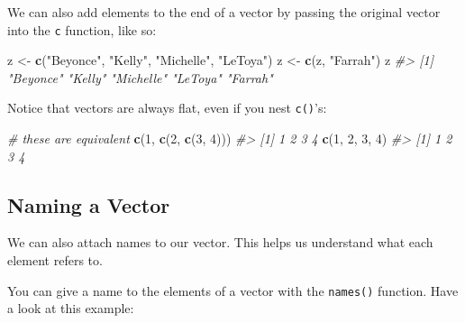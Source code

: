 \documentclass[]{book}
\newenvironment{Shaded}{\begin{snugshade}}{\end{snugshade}}
\newcommand{\CommentTok}[1]{\textcolor[rgb]{0.56,0.35,0.01}{\textit{#1}}}
\newcommand{\DecValTok}[1]{\textcolor[rgb]{0.00,0.00,0.81}{#1}}
\newcommand{\KeywordTok}[1]{\textcolor[rgb]{0.13,0.29,0.53}{\textbf{#1}}}
\newcommand{\NormalTok}[1]{#1}
\newcommand{\StringTok}[1]{\textcolor[rgb]{0.31,0.60,0.02}{#1}}
\begin{document}
We can also add elements to the end of a vector by passing the original vector into the \texttt{c} function, like so:

\begin{Shaded}
\begin{Highlighting}[]
\NormalTok{z <-}\StringTok{ }\KeywordTok{c}\NormalTok{(}\StringTok{"Beyonce"}\NormalTok{, }\StringTok{"Kelly"}\NormalTok{, }\StringTok{"Michelle"}\NormalTok{, }\StringTok{"LeToya"}\NormalTok{)}
\NormalTok{z <-}\StringTok{ }\KeywordTok{c}\NormalTok{(z, }\StringTok{"Farrah"}\NormalTok{)}
\NormalTok{z}
\CommentTok{#> [1] "Beyonce"  "Kelly"    "Michelle" "LeToya"   "Farrah"}
\end{Highlighting}
\end{Shaded}

Notice that vectors are always flat, even if you nest \texttt{c()}'s:

\begin{Shaded}
\begin{Highlighting}[]
\CommentTok{# these are equivalent}
\KeywordTok{c}\NormalTok{(}\DecValTok{1}\NormalTok{, }\KeywordTok{c}\NormalTok{(}\DecValTok{2}\NormalTok{, }\KeywordTok{c}\NormalTok{(}\DecValTok{3}\NormalTok{, }\DecValTok{4}\NormalTok{)))}
\CommentTok{#> [1] 1 2 3 4}
\KeywordTok{c}\NormalTok{(}\DecValTok{1}\NormalTok{, }\DecValTok{2}\NormalTok{, }\DecValTok{3}\NormalTok{, }\DecValTok{4}\NormalTok{)}
\CommentTok{#> [1] 1 2 3 4}
\end{Highlighting}
\end{Shaded}

\hypertarget{naming-a-vector}{%
\subsection{Naming a Vector}\label{naming-a-vector}}

We can also attach names to our vector. This helps us understand what each element refers to.

You can give a name to the elements of a vector with the \texttt{names()} function. Have a look at this example:
\end{document}
